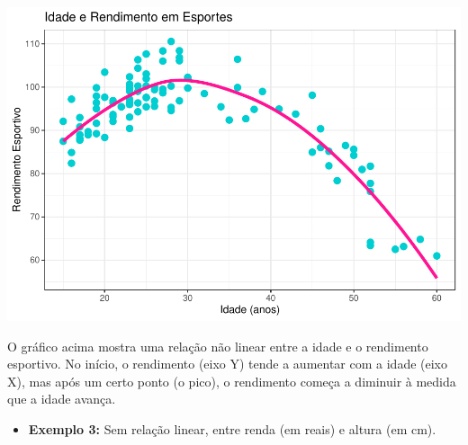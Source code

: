 \documentclass[
]{book}
\newenvironment{Shaded}{\begin{snugshade}}{\end{snugshade}}
\newcommand{\AttributeTok}[1]{\textcolor[rgb]{0.13,0.29,0.53}{#1}}
\newcommand{\ConstantTok}[1]{\textcolor[rgb]{0.56,0.35,0.01}{#1}}
\newcommand{\DecValTok}[1]{\textcolor[rgb]{0.00,0.00,0.81}{#1}}
\newcommand{\FloatTok}[1]{\textcolor[rgb]{0.00,0.00,0.81}{#1}}
\newcommand{\FunctionTok}[1]{\textcolor[rgb]{0.13,0.29,0.53}{\textbf{#1}}}
\newcommand{\NormalTok}[1]{#1}
\newcommand{\SpecialCharTok}[1]{\textcolor[rgb]{0.81,0.36,0.00}{\textbf{#1}}}
\newcommand{\StringTok}[1]{\textcolor[rgb]{0.31,0.60,0.02}{#1}}
\providecommand{\tightlist}{%
  \setlength{\itemsep}{0pt}\setlength{\parskip}{0pt}}
\begin{document}
\begin{center}\includegraphics{AED_files/figure-latex/graf_dispersao2-1} \end{center}

O gráfico acima mostra uma relação não linear entre a idade e o rendimento esportivo. No início, o rendimento (eixo Y) tende a aumentar com a idade (eixo X), mas após um certo ponto (o pico), o rendimento começa a diminuir à medida que a idade avança.

\begin{itemize}
\tightlist
\item
  \textbf{Exemplo 3:} Sem relação linear, entre renda (em reais) e altura (em cm).
\end{itemize}

\begin{Shaded}
\end{Shaded}
\end{document}
